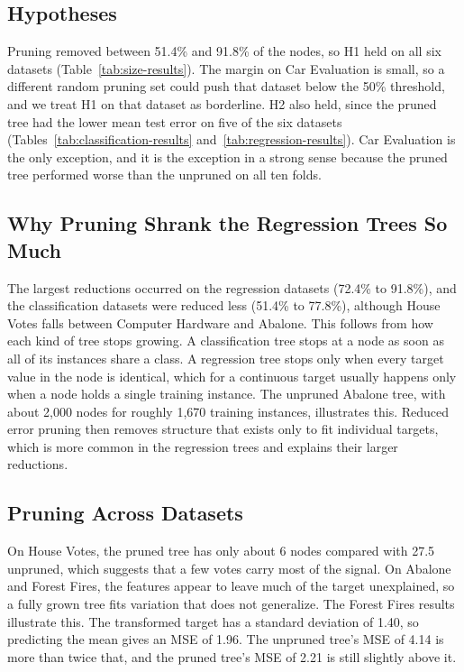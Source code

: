 \documentclass[twoside,11pt]{article}
\begin{document}
\subsection{Hypotheses}
Pruning removed between 51.4\% and 91.8\% of the nodes, so H1 held on all six datasets (Table~\ref{tab:size-results}). The margin on Car Evaluation is small, so a different random pruning set could push that dataset below the 50\% threshold, and we treat H1 on that dataset as borderline. H2 also held, since the pruned tree had the lower mean test error on five of the six datasets (Tables~\ref{tab:classification-results} and~\ref{tab:regression-results}). Car Evaluation is the only exception, and it is the exception in a strong sense because the pruned tree performed worse than the unpruned on all ten folds.

\subsection{Why Pruning Shrank the Regression Trees So Much}
The largest reductions occurred on the regression datasets (72.4\% to 91.8\%), and the classification datasets were reduced less (51.4\% to 77.8\%), although House Votes falls between Computer Hardware and Abalone. This follows from how each kind of tree stops growing. A classification tree stops at a node as soon as all of its instances share a class. A regression tree stops only when every target value in the node is identical, which for a continuous target usually happens only when a node holds a single training instance. The unpruned Abalone tree, with about 2,000 nodes for roughly 1,670 training instances, illustrates this. Reduced error pruning then removes structure that exists only to fit individual targets, which is more common in the regression trees and explains their larger reductions.

\subsection{Pruning Across Datasets}
On House Votes, the pruned tree has only about 6 nodes compared with 27.5 unpruned, which suggests that a few votes carry most of the signal. On Abalone and Forest Fires, the features appear to leave much of the target unexplained, so a fully grown tree fits variation that does not generalize. The Forest Fires results illustrate this. The transformed target has a standard deviation of 1.40, so predicting the mean gives an MSE of 1.96. The unpruned tree's MSE of 4.14 is more than twice that, and the pruned tree's MSE of 2.21 is still slightly above it.
\end{document}

